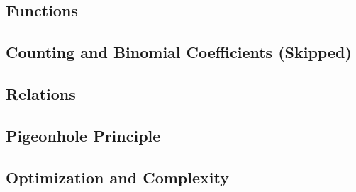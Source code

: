 \documentclass[../src/handouts/main.tex]{subfiles}
\begin{document}
\subsection{Functions}

\subsection{Counting and Binomial Coefficients (Skipped)}

\subsection{Relations}

\subsection{Pigeonhole Principle}

\subsection{Optimization and Complexity}
\end{document}
